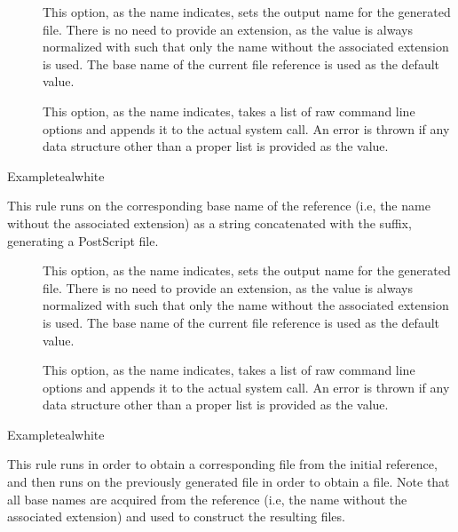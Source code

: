 \begin{description}
\begin{description}
\item[] This option, as the name indicates, sets the output name for the generated  file. There is no need to provide an extension, as the value is always normalized with  such that only the name without the associated extension is used. The base name of the current file reference is used as the default value.

\item[] This option, as the name indicates, takes a list of raw command line options and appends it to the actual system call. An error is thrown if any data structure other than a proper list is provided as the value.
\end{description}

\begin{codebox}{Example}{teal}{\icnote}{white}
\end{codebox}

\item[\rulebox{dvips}]
This rule runs  on the corresponding base name of the  reference (i.e, the name without the associated extension) as a string concatenated with the  suffix, generating a PostScript  file.

\begin{description}
\item[] This option, as the name indicates, sets the output name for the generated  file. There is no need to provide an extension, as the value is always normalized with  such that only the name without the associated extension is used. The base name of the current file reference is used as the default value.

\item[] This option, as the name indicates, takes a list of raw command line options and appends it to the actual system call. An error is thrown if any data structure other than a proper list is provided as the value.
\end{description}

\begin{codebox}{Example}{teal}{\icnote}{white}
\end{codebox}

\item[\rulebox{dvipspdf}]
This rule runs  in order to obtain a corresponding  file from the initial  reference, and then runs  on the previously generated  file in order to obtain a  file. Note that all base names are acquired from the  reference (i.e, the name without the associated extension) and used to construct the resulting files.


\end{description}
